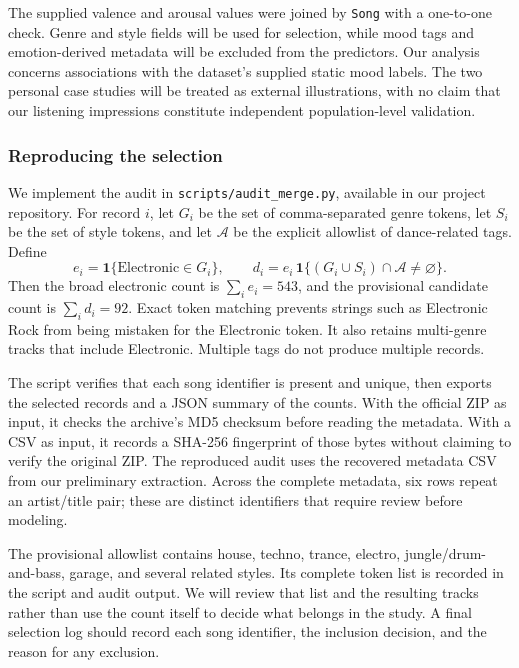 The supplied valence and arousal values were joined by \texttt{Song} with a one-to-one check. Genre and style fields will be used for selection, while mood tags and emotion-derived metadata will be excluded from the predictors. Our analysis concerns associations with the dataset's supplied static mood labels. The two personal case studies will be treated as external illustrations, with no claim that our listening impressions constitute independent population-level validation.

\subsubsection{Reproducing the selection}

We implement the audit in \texttt{scripts/audit\_merge.py}, available in our project repository. For record $i$, let $G_i$ be the set of comma-separated genre tokens, let $S_i$ be the set of style tokens, and let $\mathcal A$ be the explicit allowlist of dance-related tags. Define
\begin{equation}
 e_i=\mathbf 1\{\text{Electronic}\in G_i\},\qquad
 d_i=e_i\,\mathbf 1\{(G_i\cup S_i)\cap\mathcal A\ne\varnothing\}.
\end{equation}
Then the broad electronic count is $\sum_i e_i=543$, and the provisional candidate count is $\sum_i d_i=92$. Exact token matching prevents strings such as Electronic Rock from being mistaken for the Electronic token. It also retains multi-genre tracks that include Electronic. Multiple tags do not produce multiple records.

The script verifies that each song identifier is present and unique, then exports the selected records and a JSON summary of the counts. With the official ZIP as input, it checks the archive's MD5 checksum before reading the metadata. With a CSV as input, it records a SHA-256 fingerprint of those bytes without claiming to verify the original ZIP. The reproduced audit uses the recovered metadata CSV from our preliminary extraction. Across the complete metadata, six rows repeat an artist/title pair; these are distinct identifiers that require review before modeling.

The provisional allowlist contains house, techno, trance, electro, jungle/drum-and-bass, garage, and several related styles. Its complete token list is recorded in the script and audit output. We will review that list and the resulting tracks rather than use the count itself to decide what belongs in the study. A final selection log should record each song identifier, the inclusion decision, and the reason for any exclusion.

